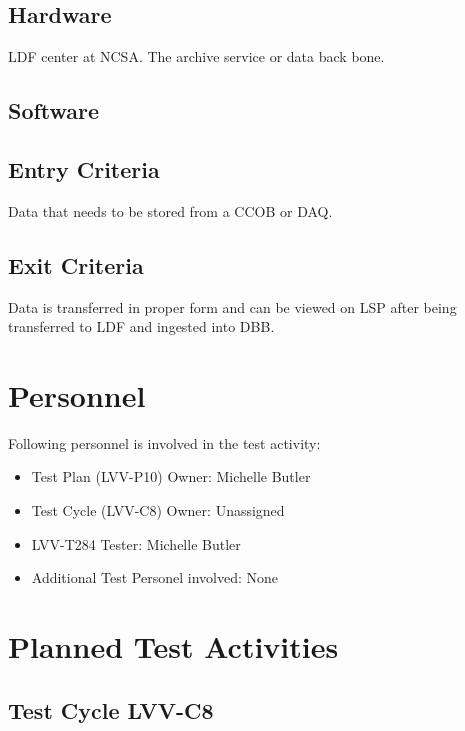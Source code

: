 \documentclass[DM,lsstdraft,STR,toc]{lsstdoc}
\begin{document}
\subsection{Hardware}
\label{sect:hwconf}

LDF center at NCSA.   The archive service or data back bone.

\subsection{Software}
\label{sect:swconf}

\subsection{Entry Criteria}

Data that needs to be stored from a CCOB or DAQ.

\subsection{Exit Criteria}

Data is transferred in proper form and can be viewed on LSP after being transferred to LDF and ingested into DBB.  


\section{Personnel}
\label{sect:personnel}

Following personnel is involved in the test activity:

\begin{itemize}
\item Test Plan (LVV-P10) Owner: Michelle Butler
\item Test Cycle (LVV-C8) Owner: Unassigned
\item LVV-T284 Tester: Michelle Butler
\item Additional Test Personel involved: None 
\end{itemize}

\newpage


\section{Planned Test Activities}
\label{sect:plannedtestactivities}

\subsection{Test Cycle LVV-C8}
\end{document}
